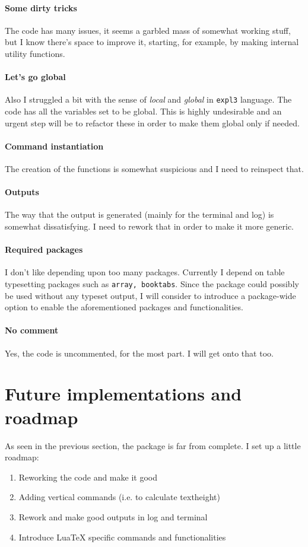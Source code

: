 \documentclass{article}
\begin{document}
\paragraph{Some dirty tricks} The code has many issues, it seems a garbled mass of somewhat working stuff, but I know there’s space to improve it, starting, for example, by making internal utility functions.

\paragraph{Let’s go global} Also I struggled a bit with the sense of \emph{local} and \emph{global} in \texttt{expl3} language. The code has all the variables set to be global. This is highly undesirable and an urgent step will be to refactor these in order to make them global only if needed.

\paragraph{Command instantiation} The creation of the functions is somewhat suspicious and I need to reinspect that.

\paragraph{Outputs} The way that the output is generated (mainly for the terminal and log) is somewhat dissatisfying. I need to rework that in order to make it more generic.

\paragraph{Required packages} I don’t like depending upon too many packages. Currently I depend on table typesetting packages such as \texttt{array, booktabs}. Since the package could possibly be used without any typeset output, I will consider to introduce a package-wide option to enable the aforementioned packages and functionalities.

\paragraph{No comment} Yes, the code is uncommented, for the most part. I will get onto that too.

\section{Future implementations and roadmap}
As seen in the previous section, the package is far from complete. I set up a little roadmap:
\begin{enumerate}
\item Reworking the code and make it good 
\item Adding vertical commands (i.e. to calculate textheight)
\item Rework and make good outputs in log and terminal
\item Introduce Lua\TeX{} specific commands and functionalities 
\end{enumerate}
\end{document}
